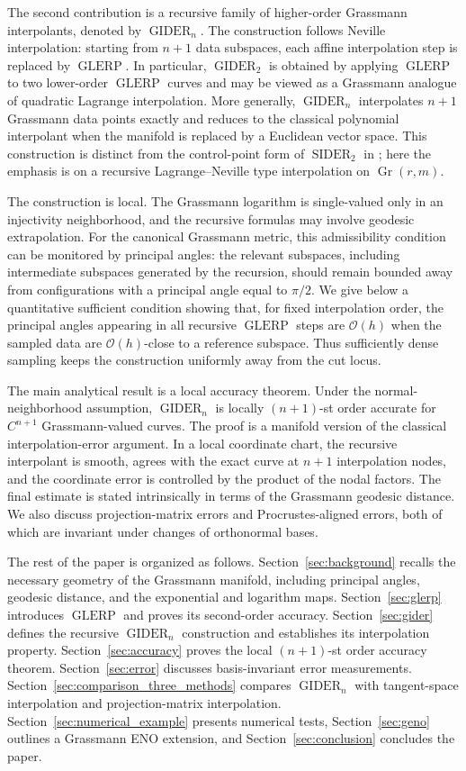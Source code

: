 \documentclass[a4paper,11pt]{article}
\newcommand{\SIDER}{\operatorname{SIDER}}
\DeclareMathOperator{\Gr}{Gr}
\newcommand{\GLERP}{\operatorname{GLERP}}
\newcommand{\GIDER}{\operatorname{GIDER}}
\numberwithin{equation}{section}
\theoremstyle{plain}
\theoremstyle{definition}
\theoremstyle{remark}
\begin{document}
The second contribution is a recursive family of higher-order Grassmann interpolants, denoted by \(\GIDER_n\).  The construction follows Neville interpolation: starting from \(n+1\) data subspaces, each affine interpolation step is replaced by \(\GLERP\).  In particular, \(\GIDER_2\) is obtained by applying \(\GLERP\) to two lower-order \(\GLERP\) curves and may be viewed as a Grassmann analogue of quadratic Lagrange interpolation.  More generally, \(\GIDER_n\) interpolates \(n+1\) Grassmann data points exactly and reduces to the classical polynomial interpolant when the manifold is replaced by a Euclidean vector space.  This construction is distinct from the control-point form of \(\SIDER_2\) in \cite{FongLeung2023}; here the emphasis is on a recursive Lagrange--Neville type interpolation on \(\Gr(r,m)\).

The construction is local.  The Grassmann logarithm is single-valued only in an injectivity neighborhood, and the recursive formulas may involve geodesic extrapolation.  For the canonical Grassmann metric, this admissibility condition can be monitored by principal angles: the relevant subspaces, including intermediate subspaces generated by the recursion, should remain bounded away from configurations with a principal angle equal to \(\pi/2\).  We give below a quantitative sufficient condition showing that, for fixed interpolation order, the principal angles appearing in all recursive \(\GLERP\) steps are \(\mathcal{O}(h)\) when the sampled data are \(\mathcal{O}(h)\)-close to a reference subspace.  Thus sufficiently dense sampling keeps the construction uniformly away from the cut locus.

The main analytical result is a local accuracy theorem.  Under the normal-neighborhood assumption, \(\GIDER_n\) is locally \((n+1)\)-st order accurate for \(C^{n+1}\) Grassmann-valued curves.  The proof is a manifold version of the classical interpolation-error argument.  In a local coordinate chart, the recursive interpolant is smooth, agrees with the exact curve at \(n+1\) interpolation nodes, and the coordinate error is controlled by the product of the nodal factors.  The final estimate is stated intrinsically in terms of the Grassmann geodesic distance.  We also discuss projection-matrix errors and Procrustes-aligned errors, both of which are invariant under changes of orthonormal bases.

The rest of the paper is organized as follows.  Section~\ref{sec:background} recalls the necessary geometry of the Grassmann manifold, including principal angles, geodesic distance, and the exponential and logarithm maps.  Section~\ref{sec:glerp} introduces \(\GLERP\) and proves its second-order accuracy.  Section~\ref{sec:gider} defines the recursive \(\GIDER_n\) construction and establishes its interpolation property.  Section~\ref{sec:accuracy} proves the local \((n+1)\)-st order accuracy theorem.  Section~\ref{sec:error} discusses basis-invariant error measurements.  Section~\ref{sec:comparison_three_methods} compares \(\GIDER_n\) with tangent-space interpolation and projection-matrix interpolation.  Section~\ref{sec:numerical_example} presents numerical tests, Section~\ref{sec:geno} outlines a Grassmann ENO extension, and Section~\ref{sec:conclusion} concludes the paper.
\end{document}
